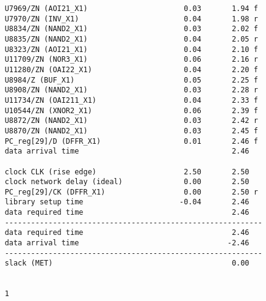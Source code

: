 \begin{lstlisting}
	U7969/ZN (AOI21_X1)                      0.03       1.94 f
	U7970/ZN (INV_X1)                        0.04       1.98 r
	U8834/ZN (NAND2_X1)                      0.03       2.02 f
	U8835/ZN (NAND2_X1)                      0.04       2.05 r
	U8323/ZN (AOI21_X1)                      0.04       2.10 f
	U11709/ZN (NOR3_X1)                      0.06       2.16 r
	U11280/ZN (OAI22_X1)                     0.04       2.20 f
	U8984/Z (BUF_X1)                         0.05       2.25 f
	U8908/ZN (NAND2_X1)                      0.03       2.28 r
	U11734/ZN (OAI211_X1)                    0.04       2.33 f
	U10544/ZN (XNOR2_X1)                     0.06       2.39 f
	U8872/ZN (NAND2_X1)                      0.03       2.42 r
	U8870/ZN (NAND2_X1)                      0.03       2.45 f
	PC_reg[29]/D (DFFR_X1)                   0.01       2.46 f
	data arrival time                                   2.46
	
	clock CLK (rise edge)                    2.50       2.50
	clock network delay (ideal)              0.00       2.50
	PC_reg[29]/CK (DFFR_X1)                  0.00       2.50 r
	library setup time                      -0.04       2.46
	data required time                                  2.46
	-----------------------------------------------------------
	data required time                                  2.46
	data arrival time                                  -2.46
	-----------------------------------------------------------
	slack (MET)                                         0.00
	
	
	1
\end{lstlisting}